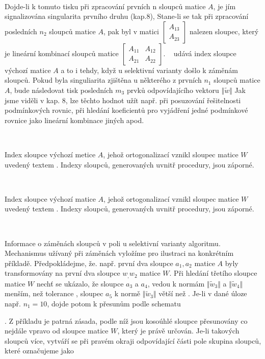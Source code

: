 {\begin{Minipage}
\\
\end{Minipage}
%
Dojde-li k tomuto tisku při zpracování prvních n sloupců
matice $A$, je jím signalizována singularita prvního druhu (kap.8),
Stane-li se tak při zpracování posledních $n_2$ sloupců matice $A$,
pak byl v matici
%
$\left[ \begin{array}{c}A_{13}\\A_{23}\end{array} \right]$
%
nalezen sloupec, který je lineární kombinací sloupců matice
%
$ \left[
\begin{array}{cc}
A_{11} & A_{12} \\ A_{21} & A_{22}
\end{array}
\right]{.} $
%
~ udává index 
sloupce výchozí matice $A$ a to i tehdy, když u selektivní varianty
došlo k záměnám sloupců. Pokud byla singuliarita zjištěna u některého
z prvních $n_1$ sloupců matice $A$, bude následovat tisk posledních
$m_3$ prvků odpovídajícího vektoru $\Vert\widetilde w\Vert$ Jak jsme
viděli v kap. 8, lze těchto hodnot užít např. při posuzování
řešitelnosti podmínkových rovnic, při hledání koeficientů pro
vyjádření jedné podmínkové rovnice jako lineární kombinace jiných
apod.

\begin{Minipage}
\\
\end{Minipage}
%
Index sloupce výchozí metice $A$, jehož ortogonalizací vznikl
sloupec matice $W$ uvedený textem . Indexy sloupců,
generovaných uvnitř procedury, jsou záporné.


\begin{Minipage}
\\
\end{Minipage}
%
Index sloupce výchozí matice $A$, jehož ortogonalizací vznikl sloupec
matice $W$ uvedený textem . Indexy sloupců,
generovaných uvnitř procedury, jsou záporné.

\begin{Minipage}
\\
\end{Minipage}
%
Informace o záměnách sloupců v poli  u selektivní varianty
algoritmu. Mechanismus užívaný při záměnách vyložíme pro ilustraci na
konkrétním příkladě. Předpokládejme, že. např. první dva sloupce $a_1,
a_2$ matice $A$ byly transformovány na první dva sloupce $w_, w_2$
matice $W$. Při hledání třetího sloupce matice $W$ nechť se ukázalo,
že sloupce $a_3$ a $a_4$, vedou k normám $\Vert\widetilde w_3\Vert$ a
$\Vert\widetilde w_4\Vert$ menším, než tolerance , sloupec
$a_5$ k normě $\Vert\widetilde w_3\Vert$ větší než
. Je-li v dané úloze např. $n_1=10$, dojde potom k přesunům
podle schematu {.
Z příkladu je patrná
zásada, podle níž jsou kosoúhlé sloupce přesunovány co nejdále
vpravo od sloupce matice $W$, který je právě určován. Je-li
takových sloupců více, vytváří se při pravém okraji odpovídající
části pole  skupina  sloupců, které označujeme
jako


}}
